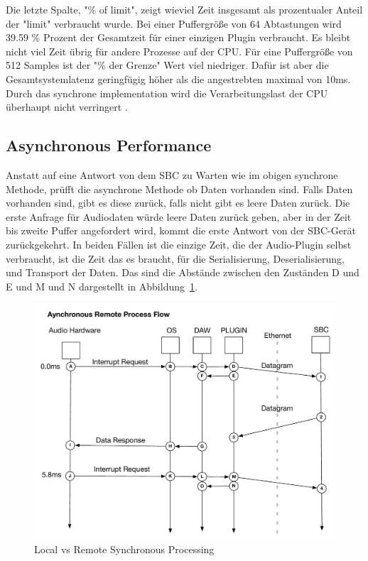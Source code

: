Die letzte Spalte, "\% of limit", zeigt wieviel Zeit insgesamt als prozentualer Anteil der "limit" verbraucht wurde. Bei einer Puffergröße von 64 Abtastungen wird 39.59 \% Prozent der Gesamtzeit für einer einzigen Plugin verbraucht. Es bleibt nicht viel Zeit übrig für andere Prozesse auf der CPU. Für eine Puffergröße von 512 Samples ist der "\% der Grenze" Wert viel niedriger. Dafür ist aber die Gesamtsystemlatenz geringfügig höher als die angestrebten maximal von 10ms. Durch das synchrone implementation wird die Verarbeitungslast der CPU überhaupt nicht verringert .


\subsection{Asynchronous Performance}

Anstatt auf eine Antwort von dem SBC zu Warten wie im obigen synchrone Methode, prüfft die asynchrone Methode ob Daten vorhanden sind. Falls Daten vorhanden sind, gibt es diese zurück, falls nicht gibt es leere Daten zurück. Die erste Anfrage für Audiodaten würde leere Daten zurück geben, aber in der Zeit bis zweite Puffer angefordert wird, kommt die erste Antwort von der SBC-Gerät zurückgekehrt. In beiden Fällen ist die einzige Zeit, die der Audio-Plugin selbst verbraucht, ist die Zeit das es braucht, für die Serialisierung, Deserialisierung, und Transport der Daten. Das sind die Abstände zwischen den Zuständen D und E und M und N dargestellt in Abbildung~\ref{fig:async_remote}.

\begin{figure}[H]
    \centering
    \includegraphics[width=\textwidth]{assets/conclusion/async_flow.pdf}
    \caption{Local vs Remote Synchronous Processing}
    \label{fig:async_remote}
\end{figure}

